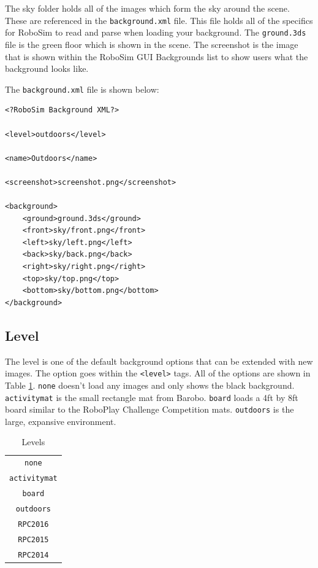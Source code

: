 \documentclass{article}
\begin{document}
The sky folder holds all of the images which form the sky around the scene.
These are referenced in the \texttt{background.xml} file.  This file holds all
of the specifics for RoboSim to read and parse when loading your background.
The \texttt{ground.3ds} file is the green floor which is shown in the scene.
The screenshot is the image that is shown within the RoboSim GUI Backgrounds
list to show users what the background looks like.

The \texttt{background.xml} file is shown below:
\begin{verbatim}
<?RoboSim Background XML?>

<level>outdoors</level>

<name>Outdoors</name>

<screenshot>screenshot.png</screenshot>

<background>
    <ground>ground.3ds</ground>
    <front>sky/front.png</front>
    <left>sky/left.png</left>
    <back>sky/back.png</back>
    <right>sky/right.png</right>
    <top>sky/top.png</top>
    <bottom>sky/bottom.png</bottom>
</background>
\end{verbatim}

\subsection{Level}
The level is one of the default background options that can be extended with new
images.  The option goes within the \texttt{<level>} tags.  All of the options
are shown in Table \ref{tab:levels}.  \texttt{none} doesn't load any images and
only shows the black background.  \texttt{activitymat} is the small rectangle
mat from Barobo.  \texttt{board} loads a 4ft by 8ft board similar to the
RoboPlay Challenge Competition mats. \texttt{outdoors} is the large, expansive
environment.

\begin{table}[H]
	\begin{center}
	\begin{tabular}{c}
		\hline \hline
		\verb|none| \\
		\verb|activitymat| \\
		\verb|board| \\
		\verb|outdoors| \\
		\verb|RPC2016| \\
		\verb|RPC2015| \\
		\verb|RPC2014| \\
		\hline \hline
	\end{tabular}
	\caption{Levels}
	\label{tab:levels}
	\end{center}
\end{table}
\end{document}
